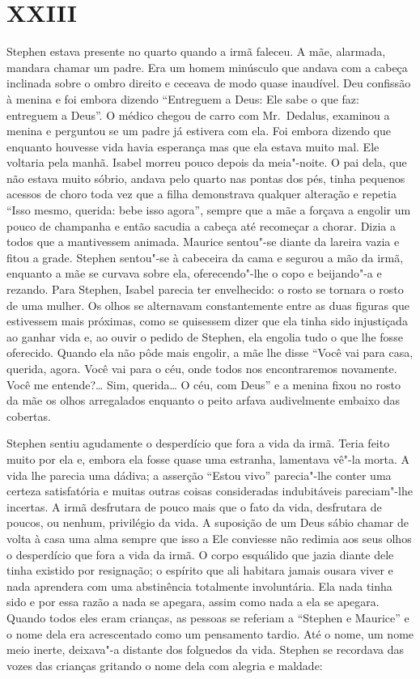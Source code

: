 \section{XXIII}

Stephen estava presente no quarto quando a irmã faleceu.  A mãe, alarmada,
mandara chamar um padre.  Era um homem minúsculo que andava com a cabeça
inclinada sobre o ombro direito e ceceava de modo quase inaudível.  Deu
confissão à menina e foi embora dizendo “Entreguem a Deus: Ele sabe o que faz:
entreguem a Deus”.  O médico chegou de carro com Mr.~Dedalus, examinou a
menina e perguntou se um padre já estivera com ela.  Foi embora dizendo que
enquanto houvesse vida havia esperança mas que ela estava muito mal.  Ele
voltaria pela manhã.  Isabel morreu pouco depois da meia"-noite.  O pai dela,
que não estava muito sóbrio, andava pelo quarto nas pontas dos pés, tinha
pequenos acessos de choro toda vez que a filha demonstrava qualquer alteração e
repetia “Isso mesmo, querida: bebe isso agora”, sempre que a mãe a forçava a
engolir um pouco de champanha e então sacudia a cabeça até recomeçar a chorar.
Dizia a todos que a mantivessem animada.  Maurice sentou"-se diante da lareira
vazia e fitou a grade.  Stephen sentou"-se à cabeceira da cama e segurou a mão
da irmã, enquanto a mãe se curvava sobre ela, oferecendo"-lhe o copo e
beijando"-a e rezando.  Para Stephen, Isabel parecia ter envelhecido: o rosto se
tornara o rosto de uma mulher.  Os olhos se alternavam constantemente entre as
duas figuras que estivessem mais próximas, como se quisessem dizer que ela
tinha sido injustiçada ao ganhar vida e, ao ouvir o pedido de Stephen, ela
engolia tudo o que lhe fosse oferecido.  Quando ela não pôde mais engolir, a
mãe lhe disse “Você vai para casa, querida, agora.  Você vai para o céu, onde
todos nos encontraremos novamente.  Você me entende?\ldots{}  Sim, querida\ldots{}  O
céu, com Deus” e a menina fixou no rosto da mãe os olhos arregalados enquanto o
peito arfava audivelmente embaixo das cobertas.

Stephen sentiu agudamente o desperdício que fora a vida da irmã.  Teria feito
muito por ela e, embora ela fosse quase uma estranha, lamentava vê"-la morta.  A
vida lhe parecia uma dádiva; a asserção “Estou vivo” parecia"-lhe conter uma
certeza satisfatória e muitas outras coisas consideradas indubitáveis
pareciam"-lhe incertas.  A irmã desfrutara de pouco mais que o fato da vida,
desfrutara de poucos, ou nenhum, privilégio da vida.  A suposição de um Deus
sábio chamar de volta à casa uma alma sempre que isso a Ele conviesse não
redimia aos seus olhos o desperdício que fora a vida da irmã.  O corpo
esquálido que jazia diante dele tinha existido por resignação; o espírito que
ali habitara jamais ousara viver e nada aprendera com uma abstinência
totalmente involuntária.  Ela nada tinha sido e por essa razão a nada se
apegara, assim como nada a ela se apegara.  Quando todos eles eram crianças, as
pessoas se referiam a “Stephen e Maurice” e o nome dela era acrescentado como
um pensamento tardio.  Até o nome, um nome meio inerte, deixava"-a distante dos
folguedos da vida.  Stephen se recordava das vozes das crianças gritando o nome
dela com alegria e maldade:

